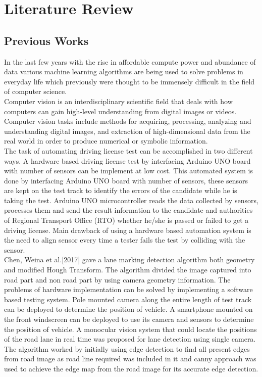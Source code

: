 \chapter{Literature Review}
\section{Previous Works}
In the last few years with the rise in affordable compute power and abundance of data various machine learning algorithms are being used to solve problems in everyday life which previously were thought to be immensely difficult in the field of computer science.
\\
Computer vision is an interdisciplinary scientific field that deals with how computers can gain high-level understanding from digital images or videos. Computer vision tasks include methods for acquiring, processing, analyzing and understanding digital images, and extraction of high-dimensional data from the real world in order to produce numerical or symbolic information.\\
The task of automating driving license test can be accomplished in two different ways. A hardware based driving license test by interfacing Arduino UNO board with number of sensors can be implement at low cost. This automated system is done by interfacing Arduino UNO board with number of sensors, these sensors are kept on the test track to identify the errors of the candidate while he is taking the test. Arduino UNO microcontroller reads the data collected by sensors, processes them and send the result information to the candidate and authorities of Regional Transport Office (RTO) whether he/she is passed or failed to get a driving license\cite{femto_anup}. Main drawback of using a hardware based automation system is the need to align sensor every time a tester fails the test by colliding with the sensor. 
\\
Chen, Weina et al.[2017] \cite{chen} gave a lane marking detection algorithm both geometry and modified Hough Transform. The algorithm divided the image captured into road part and non road part by using camera geometry information. 
The problems of hardware implementation can be solved by implementing a software based testing system. Pole mounted camera along the entire length of test track can be deployed to determine the position of vehicle. A smartphone mounted on the front windscreen can be deployed to use its camera and sensors to determine the position of vehicle.
A monocular vision system that could locate the positions of the road lane in real time was proposed for lane detection using single camera. The algorithm worked by initially using edge detection to find all present edges from road image as road line required was included in it and canny approach was used to achieve the edge map from the road image for its accurate edge detection. \cite{improved cannyedge}
